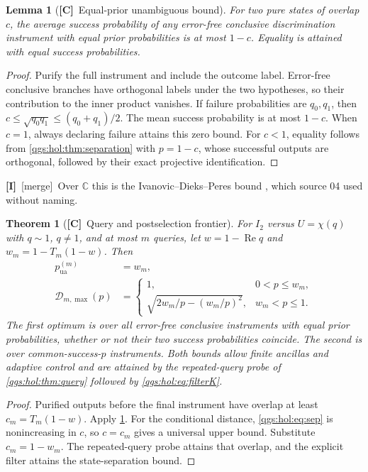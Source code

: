 \documentclass[11pt,oneside]{article}
\numberwithin{equation}{section}
\theoremstyle{plain}
\newtheorem{theorem}{Theorem}[section]
\newtheorem{lemma}[lemma]{Lemma}
\theoremstyle{definition}
\theoremstyle{remark}
\newcommand{\C}{\mathbb C}
\newcommand{\TD}{\mathcal D}
\DeclareMathOperator{\Rea}{Re}
\newcommand{\TC}{\textcolor{TierC}{\textsf{\bfseries[C]}}}
\newcommand{\TI}{\textcolor{TierI}{\textsf{\bfseries[I]}}}
\newcommand{\merge}{{\small\textsf{[merge]}}}
\begin{document}
\begin{lemma}[\TC\ Equal-prior unambiguous bound]\label{qgs:hol:lem:ua}
For two pure states of overlap $c$, the average success probability of any error-free conclusive discrimination instrument with equal prior probabilities is at most $1-c$. Equality is attained with equal success probabilities.
\end{lemma}
\begin{proof}
Purify the full instrument and include the outcome label. Error-free conclusive branches have orthogonal labels under the two hypotheses, so their contribution to the inner product vanishes. If failure probabilities are $q_0,q_1$, then $c\leq\sqrt{q_0q_1}\leq(q_0+q_1)/2$. The mean success probability is at most $1-c$. When $c=1$, always declaring failure attains this zero bound. For $c<1$, equality follows from \cref{qgs:hol:thm:separation} with $p=1-c$, whose successful outputs are orthogonal, followed by their exact projective identification.
\end{proof}

\TI\ \merge\ Over $\C$ this is the Ivanovic--Dieks--Peres bound \cite{Ivanovic,Dieks,Peres}, which source 04 used without naming.

\begin{theorem}[\TC\ Query and postselection frontier]\label{qgs:hol:thm:frontier}
For $I_2$ versus $U=\chi(q)$ with $q\sim1$, $q\neq1$, and at most $m$ queries, let $w=1-\Rea q$ and $w_m=1-T_m(1-w)$. Then
\begin{align}
 p_{\mathrm{ua}}^{(m)}&=w_m,\label{qgs:hol:eq:ua-m}\\
 \TD_{m,\max}(p)&=
 \begin{cases}
 1,&0<p\leq w_m,\\
 \sqrt{2w_m/p-(w_m/p)^2},&w_m<p\leq1.
 \end{cases}\label{qgs:hol:eq:frontier}
\end{align}
The first optimum is over all error-free conclusive instruments with equal prior probabilities, whether or not their two success probabilities coincide. The second is over common-success-$p$ instruments. Both bounds allow finite ancillas and adaptive control and are attained by the repeated-query probe of \cref{qgs:hol:thm:query} followed by \eqref{qgs:hol:eq:filterK}.
\end{theorem}
\begin{proof}
Purified outputs before the final instrument have overlap at least $c_m=T_m(1-w)$. Apply \cref{qgs:hol:lem:ua}. For the conditional distance, \eqref{qgs:hol:eq:sep} is nonincreasing in $c$, so $c=c_m$ gives a universal upper bound. Substitute $c_m=1-w_m$. The repeated-query probe attains that overlap, and the explicit filter attains the state-separation bound.
\end{proof}
\end{document}
